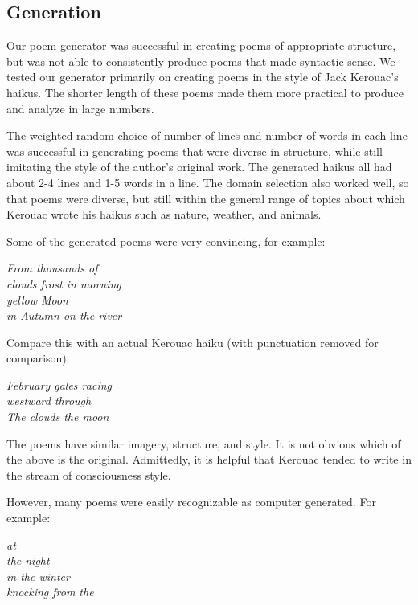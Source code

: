 \documentclass[journal]{IEEEtran}
\begin{document}
\subsection{Generation}
Our poem generator was successful in creating poems of appropriate structure, but was not able to consistently produce poems that made syntactic sense. We tested our generator primarily on creating poems in the style of Jack Kerouac’s haikus. The shorter length of these poems made them more practical to produce and analyze in large numbers. 

The weighted random choice of number of lines and number of words in each line was successful in generating poems that were diverse in structure, while still imitating the style of the author’s original work. The generated haikus all had about 2-4 lines and 1-5 words in a line. The domain selection also worked well, so that poems were diverse, but still within the general range of topics about which Kerouac wrote his haikus such as nature, weather, and animals.

Some of the generated poems were very convincing, for example:
\begin{center}
    \textit{
        From thousands of\\
        clouds frost in morning\\
        yellow Moon\\
        in Autumn on the river\\
        }
\end{center}

Compare this with an actual Kerouac haiku (with punctuation removed for comparison):
\begin{center}
    \textit{
        February gales racing\\
        westward through\\
        The clouds the moon\\
        }
\end{center}

The poems have similar imagery, structure, and style. It is not obvious which of the above is the original. Admittedly, it is helpful that Kerouac tended to write in the stream of consciousness style. 

However, many poems were easily recognizable as computer generated. For example:
\begin{center}
    \textit{
        at\\
        the night\\
        in the winter\\
        knocking from the\\
        }
\end{center}
\end{document}
